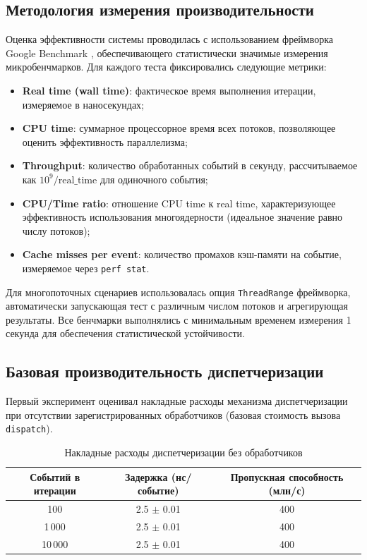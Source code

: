 \subsection{Методология измерения производительности}

Оценка эффективности системы проводилась с использованием фреймворка Google Benchmark \cite{googlebenchmark}, обеспечивающего статистически значимые измерения микробенчмарков. Для каждого теста фиксировались следующие метрики:

\begin{itemize}
    \item \textbf{Real time (wall time)}: фактическое время выполнения итерации, измеряемое в наносекундах;
    \item \textbf{CPU time}: суммарное процессорное время всех потоков, позволяющее оценить эффективность параллелизма;
    \item \textbf{Throughput}: количество обработанных событий в секунду, рассчитываемое как $10^9 / \text{real\_time}$ для одиночного события;
    \item \textbf{CPU/Time ratio}: отношение CPU time к real time, характеризующее эффективность использования многоядерности (идеальное значение равно числу потоков);
    \item \textbf{Cache misses per event}: количество промахов кэш-памяти на событие, измеряемое через \texttt{perf stat}.
\end{itemize}

Для многопоточных сценариев использовалась опция \texttt{ThreadRange} фреймворка, автоматически запускающая тест с различным числом потоков и агрегирующая результаты. Все бенчмарки выполнялись с минимальным временем измерения 1 секунда для обеспечения статистической устойчивости.

\subsection{Базовая производительность диспетчеризации}

Первый эксперимент оценивал накладные расходы механизма диспетчеризации при отсутствии зарегистрированных обработчиков (базовая стоимость вызова \texttt{dispatch}).

\begin{table}[H]
\centering
\caption{Накладные расходы диспетчеризации без обработчиков}
\label{tab:baseline_dispatch}
\begin{tabular}{ccc}
\toprule
\textbf{Событий в итерации} & \textbf{Задержка (нс/событие)} & \textbf{Пропускная способность (млн/с)} \\
\midrule
100 & 2.5 $\pm$ 0.01 & 400 \\
1\,000 & 2.5 $\pm$ 0.01 & 400 \\
10\,000 & 2.5 $\pm$ 0.01 & 400 \\
\bottomrule
\end{tabular}
\end{table}

